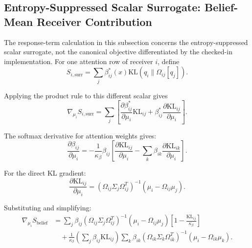 \documentclass[11pt]{article}
\begin{document}
\subsection*{Entropy-Suppressed Scalar Surrogate: Belief-Mean Receiver Contribution}

The response-term calculation in this subsection concerns the entropy-suppressed scalar surrogate, not the canonical objective differentiated by the checked-in implementation. For one attention row of receiver $i$, define
\begin{equation}
S_{i,\mathrm{surr}} = \sum_j \beta_{ij}^*(x)\mathrm{KL}(q_i \| \Omega_{ij}[q_j]).
\end{equation}

Applying the product rule to this different scalar gives
\begin{equation}
\nabla_{\mu_i} S_{i,\mathrm{surr}} = \sum_j \left[ \frac{\partial \beta_{ij}^*}{\partial \mu_i} \mathrm{KL}_{ij} + \beta_{ij}^* \frac{\partial \mathrm{KL}_{ij}}{\partial \mu_i} \right].
\end{equation}

The softmax derivative for attention weights gives:
\begin{equation}
\frac{\partial \beta_{ij}}{\partial \mu_i} = -\frac{1}{\kappa_\beta} \beta_{ij} \left[\frac{\partial \mathrm{KL}_{ij}}{\partial \mu_i} - \sum_k \beta_{ik} \frac{\partial \mathrm{KL}_{ik}}{\partial \mu_i}\right].
\end{equation}

For the direct KL gradient:
\begin{equation}
\frac{\partial \mathrm{KL}_{ij}}{\partial \mu_i} = (\Omega_{ij}\Sigma_j\Omega_{ij}^T)^{-1}(\mu_i - \Omega_{ij}\mu_j).
\end{equation}

Substituting and simplifying:
\begin{align}
\nabla_{\mu_i} S_{\mathrm{belief}} &= \sum_j \beta_{ij} (\Omega_{ij}\Sigma_j\Omega_{ij}^T)^{-1}(\mu_i - \Omega_{ij}\mu_j) \left[1 - \frac{\mathrm{KL}_{ij}}{\kappa_\beta}\right] \nonumber \\
&\quad + \frac{1}{\kappa_\beta}\left(\sum_j \beta_{ij}\mathrm{KL}_{ij}\right) \sum_k \beta_{ik} (\Omega_{ik}\Sigma_k\Omega_{ik}^T)^{-1}(\mu_i - \Omega_{ik}\mu_k).
\end{align}
\end{document}
